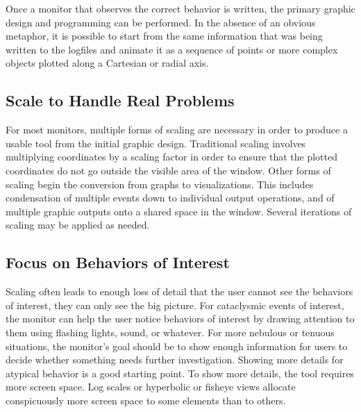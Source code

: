 \vspace{1pc}


\vspace{0.25pc}
\noindent
Once a monitor that observes the correct behavior is written, the primary
graphic design and programming can be performed.  In the absence of an
obvious metaphor, it is possible to start from the same information that
was being written to the logfiles and animate it as a sequence of points or
more complex objects plotted along a Cartesian or radial axis.

\subsection*{Scale to Handle Real Problems}

For most monitors, multiple forms of scaling are necessary in order to
produce a usable tool from the initial graphic design.  Traditional scaling
involves multiplying coordinates by a scaling factor in order to ensure
that the plotted coordinates do not go outside the visible area of the
window.  Other forms of scaling begin the conversion from graphs to
visualizations. This includes condensation of multiple events down to
individual output operations, and of multiple graphic outputs onto
a shared space in the window.  Several iterations of scaling may be applied
as needed.

\subsection*{Focus on Behaviors of Interest}

Scaling often leads to enough loss of detail that the user cannot see the
behaviors of interest, they can only see the big picture.  For cataclysmic
events of interest, the monitor can help the user notice behaviors of
interest by drawing attention to them using flashing lights, sound, or
whatever. For more nebulous or tenuous situations, the monitor's goal should
be to show enough information for users to decide whether something needs
further investigation.  Showing more details for atypical behavior is a good
starting point.  To show more details, the tool requires more screen space.
Log scales or hyperbolic or fisheye views allocate conspicuously more screen
space to some elements than to others.

